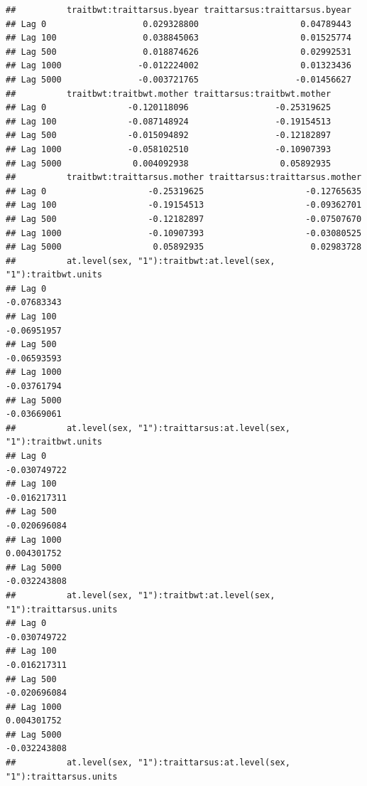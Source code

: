 \documentclass[
  12pt,
]{book}
\begin{document}
\begin{verbatim}
##          traitbwt:traittarsus.byear traittarsus:traittarsus.byear
## Lag 0                   0.029328800                    0.04789443
## Lag 100                 0.038845063                    0.01525774
## Lag 500                 0.018874626                    0.02992531
## Lag 1000               -0.012224002                    0.01323436
## Lag 5000               -0.003721765                   -0.01456627
##          traitbwt:traitbwt.mother traittarsus:traitbwt.mother
## Lag 0                -0.120118096                 -0.25319625
## Lag 100              -0.087148924                 -0.19154513
## Lag 500              -0.015094892                 -0.12182897
## Lag 1000             -0.058102510                 -0.10907393
## Lag 5000              0.004092938                  0.05892935
##          traitbwt:traittarsus.mother traittarsus:traittarsus.mother
## Lag 0                    -0.25319625                    -0.12765635
## Lag 100                  -0.19154513                    -0.09362701
## Lag 500                  -0.12182897                    -0.07507670
## Lag 1000                 -0.10907393                    -0.03080525
## Lag 5000                  0.05892935                     0.02983728
##          at.level(sex, "1"):traitbwt:at.level(sex, "1"):traitbwt.units
## Lag 0                                                      -0.07683343
## Lag 100                                                    -0.06951957
## Lag 500                                                    -0.06593593
## Lag 1000                                                   -0.03761794
## Lag 5000                                                   -0.03669061
##          at.level(sex, "1"):traittarsus:at.level(sex, "1"):traitbwt.units
## Lag 0                                                        -0.030749722
## Lag 100                                                      -0.016217311
## Lag 500                                                      -0.020696084
## Lag 1000                                                      0.004301752
## Lag 5000                                                     -0.032243808
##          at.level(sex, "1"):traitbwt:at.level(sex, "1"):traittarsus.units
## Lag 0                                                        -0.030749722
## Lag 100                                                      -0.016217311
## Lag 500                                                      -0.020696084
## Lag 1000                                                      0.004301752
## Lag 5000                                                     -0.032243808
##          at.level(sex, "1"):traittarsus:at.level(sex, "1"):traittarsus.units

\end{verbatim}
\end{document}
